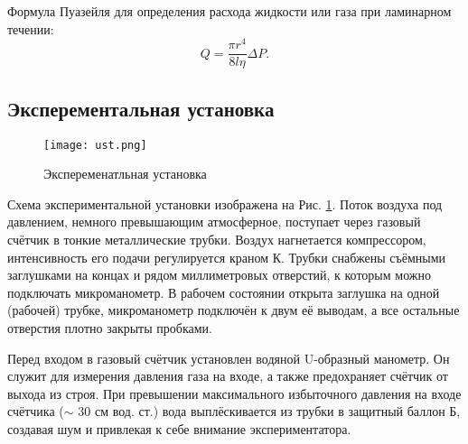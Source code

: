 Формула Пуазейля для определения расхода жидкости или газа при ламинарном течении:
\begin{equation}
    Q = \frac{\pi r^4}{8l\eta}\Delta P.
    \label{equ:puaz}
\end{equation}
\subsection{Эксперементальная установка}
\begin{figure}[h]
    \centering
    \texttt{[image: ust.png]}
    \caption{Экспеременатльная установка}
    \label{pic:ust}
\end{figure}
Схема экспериментальной установки изображена на Рис. \ref*{pic:ust}. Поток воздуха
под давлением, немного превышающим атмосферное, поступает через
газовый счётчик в тонкие металлические трубки. Воздух нагнетается
компрессором, интенсивность его подачи регулируется краном К. Трубки снабжены
съёмными заглушками на концах и рядом миллиметровых отверстий, к
которым можно подключать микроманометр. В рабочем состоянии открыта
заглушка на одной (рабочей) трубке, микроманометр подключён к двум её
выводам, а все остальные отверстия плотно закрыты пробками.

Перед входом в газовый счётчик установлен водяной U-образный
манометр. Он служит для измерения давления газа на входе, а также предохраняет
счётчик от выхода из строя. При превышении максимального избыточного
давления на входе счётчика ($\sim$  30 см вод. ст.) вода выплёскивается из трубки
в защитный баллон Б, создавая шум и привлекая к себе внимание экспериментатора.

